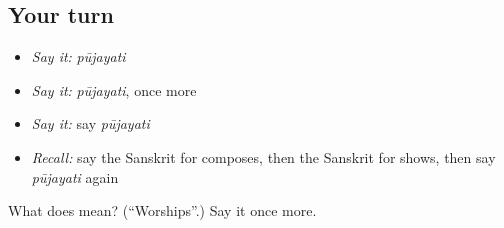 \subsection*{Your turn}
\begin{itemize}
\raggedright
  \item \emph{Say it:} \emph{pūjayati}
  \item \emph{Say it:} \emph{pūjayati}, once more
  \item \emph{Say it:} say \emph{pūjayati}
  \item \emph{Recall:} say the Sanskrit for composes, then the Sanskrit for shows, then say \emph{pūjayati} again
\end{itemize}

\begin{tcolorbox}[breakable,colback=teal!4,colframe=teal!35!black,title={Before you move on}]
What does  mean? (\textquotedblleft{}Worships\textquotedblright{}.) Say it once more.
\end{tcolorbox}
